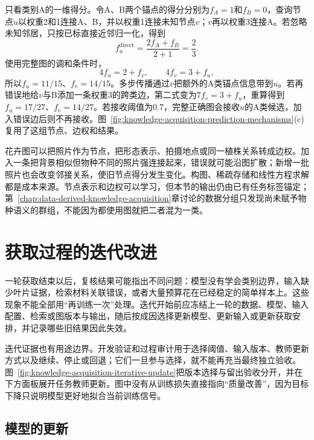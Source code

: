 \begin{example}
  \label{ex:knowledge-acquisition-graph-propagation}
  只看类别A的一维得分。令A、B两个锚点的得分分别为$f_A=1$和$f_B=0$，查询节点$u$以权重2和1连接A、B，并以权重1连接未知节点$v$；$v$再以权重3连接A。若忽略未知邻居，只按已标直接近邻归一化，得到
  \[
    f_u^{\mathrm{direct}}=\frac{2f_A+f_B}{2+1}=\frac{2}{3}.
  \]
  使用完整图的调和条件时，
  \[
    4f_u=2+f_v,\qquad 4f_v=3+f_u,
  \]
  所以$f_u=11/15$、$f_v=14/15$。多步传播通过$v$把额外的A类锚点信息带到$u$。若再错误地给$v$与B添加一条权重3的跨类边，第二式变为$7f_v=3+f_u$，重算得到$f_u=17/27$、$f_v=14/27$。若接收阈值为$0.7$，完整正确图会接收$u$的A类候选，加入错误边后则不再接收。图~\ref{fig:knowledge-acquisition-prediction-mechanisms}(c)复用了这组节点、边权和结果。
\end{example}

花卉图可以把照片作为节点，把形态表示、拍摄地点或同一植株关系转成边权。加入一条把背景相似但物种不同的照片强连接起来，错误就可能沿图扩散；新增一批照片也会改变邻接关系，使旧节点得分发生变化。构图、稀疏存储和线性方程求解都是成本来源。节点表示和边权可以学习，但本节的输出仍由已有任务标签锚定；第~\ref{chap:data-derived-knowledge-acquisition}章讨论的数据分组只发现尚未赋予物种语义的群组，不能因为都使用图就把二者混为一类。

\section{获取过程的迭代改进}
\label{sec:knowledge-acquisition-iterative-improvement}

一轮获取结束以后，复核结果可能指出不同问题：模型没有学会类别边界，输入缺少叶片证据，检索材料关联错误，或者大量预算花在已经稳定的简单样本上。这些现象不能全部用“再训练一次”处理。迭代开始前应冻结上一轮的数据、模型、输入配置、检索或图版本与输出，随后按成因选择更新模型、更新输入或更新获取安排，并记录哪些旧结果因此失效。

迭代证据也有用途边界。开发验证和过程审计用于选择阈值、输入版本、教师更新方式以及继续、停止或回退；它们一旦参与选择，就不能再充当最终独立验收。图~\ref{fig:knowledge-acquisition-iterative-update}把版本选择与留出验收分开，并在下方面板展开任务教师更新。图中没有从训练损失直接指向“质量改善”，因为目标下降只说明模型更好地拟合当前训练信号。

\subsection{模型的更新}
\label{sec:knowledge-acquisition-model-update}

